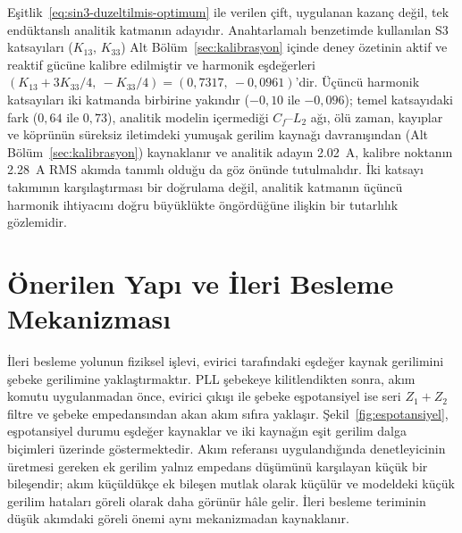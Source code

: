 Eşitlik~\eqref{eq:sin3-duzeltilmis-optimum} ile verilen çift, uygulanan kazanç değil, tek endüktanslı analitik katmanın adayıdır. Anahtarlamalı benzetimde kullanılan S3 katsayıları ($K_{13}$, $K_{33}$) Alt Bölüm~\ref{sec:kalibrasyon} içinde deney özetinin aktif ve reaktif gücüne kalibre edilmiştir ve harmonik eşdeğerleri $(K_{13}+3K_{33}/4,\ -K_{33}/4)=(0{,}7317,\ -0{,}0961)$'dir. Üçüncü harmonik katsayıları iki katmanda birbirine yakındır ($-0{,}10$ ile $-0{,}096$); temel katsayıdaki fark ($0{,}64$ ile $0{,}73$), analitik modelin içermediği $C_f$--$L_2$ ağı, ölü zaman, kayıplar ve köprünün süreksiz iletimdeki yumuşak gerilim kaynağı davranışından (Alt Bölüm~\ref{sec:kalibrasyon}) kaynaklanır ve analitik adayın \SI{2.02}{\ampere}, kalibre noktanın \SI{2.28}{\ampere} RMS akımda tanımlı olduğu da göz önünde tutulmalıdır. İki katsayı takımının karşılaştırması bir doğrulama değil, analitik katmanın üçüncü harmonik ihtiyacını doğru büyüklükte öngördüğüne ilişkin bir tutarlılık gözlemidir.

\section{Önerilen Yapı ve İleri Besleme Mekanizması}

İleri besleme yolunun fiziksel işlevi, evirici tarafındaki eşdeğer kaynak gerilimini şebeke gerilimine yaklaştırmaktır. PLL şebekeye kilitlendikten sonra, akım komutu uygulanmadan önce, evirici çıkışı ile şebeke eşpotansiyel ise seri $Z_1+Z_2$ filtre ve şebeke empedansından akan akım sıfıra yaklaşır. Şekil~\ref{fig:espotansiyel}, eşpotansiyel durumu eşdeğer kaynaklar ve iki kaynağın eşit gerilim dalga biçimleri üzerinde göstermektedir. Akım referansı uygulandığında denetleyicinin üretmesi gereken ek gerilim yalnız empedans düşümünü karşılayan küçük bir bileşendir; akım küçüldükçe ek bileşen mutlak olarak küçülür ve modeldeki küçük gerilim hataları göreli olarak daha görünür hâle gelir. İleri besleme teriminin düşük akımdaki göreli önemi aynı mekanizmadan kaynaklanır.

